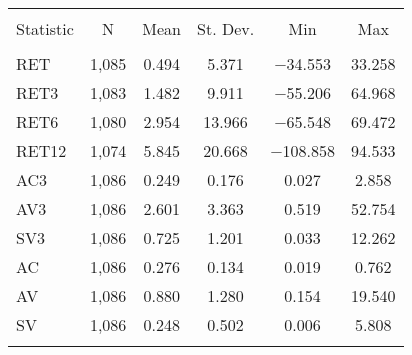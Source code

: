 
\begin{table}[!htbp] \centering 
  \caption{} 
  \label{} 
\begin{tabular}{@{\extracolsep{5pt}}lccccc} 
\\[-1.8ex]\hline 
\hline \\[-1.8ex] 
Statistic & \multicolumn{1}{c}{N} & \multicolumn{1}{c}{Mean} & \multicolumn{1}{c}{St. Dev.} & \multicolumn{1}{c}{Min} & \multicolumn{1}{c}{Max} \\ 
\hline \\[-1.8ex] 
RET & 1,085 & 0.494 & 5.371 & $-$34.553 & 33.258 \\ 
RET3 & 1,083 & 1.482 & 9.911 & $-$55.206 & 64.968 \\ 
RET6 & 1,080 & 2.954 & 13.966 & $-$65.548 & 69.472 \\ 
RET12 & 1,074 & 5.845 & 20.668 & $-$108.858 & 94.533 \\ 
AC3 & 1,086 & 0.249 & 0.176 & 0.027 & 2.858 \\ 
AV3 & 1,086 & 2.601 & 3.363 & 0.519 & 52.754 \\ 
SV3 & 1,086 & 0.725 & 1.201 & 0.033 & 12.262 \\ 
AC & 1,086 & 0.276 & 0.134 & 0.019 & 0.762 \\ 
AV & 1,086 & 0.880 & 1.280 & 0.154 & 19.540 \\ 
SV & 1,086 & 0.248 & 0.502 & 0.006 & 5.808 \\ 
\hline \\[-1.8ex] 
\end{tabular} 
\end{table} 
